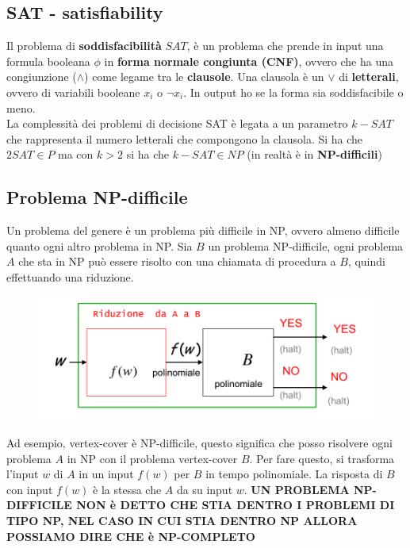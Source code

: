 \subsection{SAT - satisfiability}
Il problema di \textbf{soddisfacibilità} $SAT$, è un problema che prende in input una formula booleana $\phi$ in \textbf{forma normale congiunta (CNF)}, ovvero che ha una congiunzione ($\land$) come legame tra le \textbf{clausole}. Una clausola è un $\lor$ di \textbf{letterali}, ovvero di variabili booleane $x_i$ o $\neg x_i$. In output ho se la forma sia soddisfacibile o meno.\\

La complessità dei problemi di decisione SAT è legata a un parametro $k-SAT$ che rappresenta il numero letterali che compongono la clausola. Si ha che $2SAT\in P$ ma con $k>2$ si ha che $k-SAT\in NP$ (in realtà è in \textbf{NP-difficili})

\subsection{Problema NP-difficile}
Un problema del genere è un problema più difficile in NP, ovvero almeno difficile quanto ogni altro problema in NP. Sia $B$ un problema NP-difficile, ogni problema $A$ che sta in NP può essere risolto con una chiamata di procedura a $B$, quindi effettuando una riduzione. \\
\begin{figure}[H]
    \centering
    \includegraphics[scale = 0.5]{imm/riduzione.PNG}
    \label{fig:my_label}
\end{figure}
Ad esempio, vertex-cover è NP-difficile, questo significa che posso risolvere ogni problema $A$ in NP con il problema vertex-cover $B$. Per fare questo, si trasforma l’input $w$ di $A$ in un input $f(w)$ per $B$ in tempo polinomiale. La risposta di $B$ con input $f(w)$ è la stessa che $A$ da su input $w$.
\newline
\textbf{UN PROBLEMA NP-DIFFICILE NON è DETTO CHE STIA DENTRO I PROBLEMI DI TIPO NP, NEL CASO IN CUI STIA DENTRO NP ALLORA POSSIAMO DIRE CHE è NP-COMPLETO}


